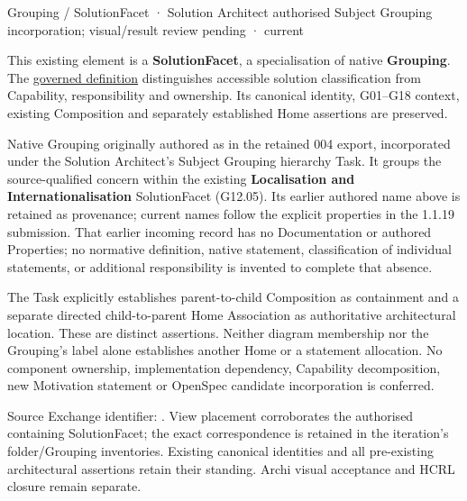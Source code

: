 \label{element:f71f084dd9154318b86ca22f0fe8c36d}
{\small Grouping / SolutionFacet · Solution Architect authorised Subject Grouping incorporation; visual/result review pending · current}\par

This existing element is a \textbf{SolutionFacet}, a specialisation of native
\textbf{Grouping}. The \href{\detokenize{../../../../../../../governance/continuum-representation.md#solutionfacet-classification--1119-candidate}}{governed definition}
distinguishes accessible solution classification from Capability, responsibility
and ownership. Its canonical identity, G01–G18 context, existing Composition
and separately established Home assertions are preserved.



Native Grouping originally authored as \texttt{} in the retained 004 export,
incorporated under the Solution Architect's Subject Grouping hierarchy Task.
It groups the source-qualified \texttt{} concern within
the existing \textbf{Localisation and Internationalisation} SolutionFacet (G12.05). Its earlier authored name above is retained as provenance; current names
follow the explicit properties in the 1.1.19 submission.
That earlier incoming record has no Documentation or authored Properties; no normative
definition, native statement, classification of individual statements, or
additional responsibility is invented to complete that absence.



The Task explicitly establishes parent-to-child Composition as containment and
a separate directed child-to-parent Home Association as authoritative architectural
location. These are distinct assertions. Neither diagram membership nor the
Grouping's label alone establishes another Home or a statement allocation.
No component ownership, implementation dependency, Capability decomposition,
new Motivation statement or OpenSpec candidate incorporation is conferred.



Source Exchange identifier: \texttt{}. View placement corroborates
the authorised containing SolutionFacet; the exact correspondence is retained in the
iteration's folder/Grouping inventories. Existing canonical identities and all
pre-existing architectural assertions retain their standing. Archi visual
acceptance and HCRL closure remain separate.



